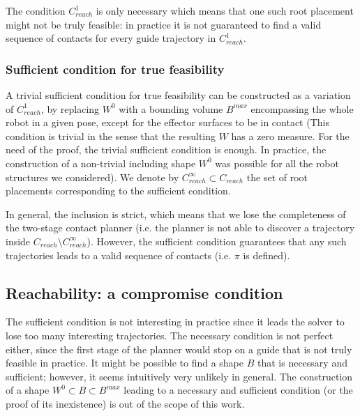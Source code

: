 The condition $C_{reach}^1$ is only necessary which means that one such root placement might not be truly feasible: in practice it is not guaranteed to find a valid sequence of contacts for every guide trajectory in $C_{reach}^1$.

\subsubsection*{Sufficient condition for true feasibility}
A trivial sufficient condition for true feasibility can be constructed as a variation of $C_{reach}^1$, by replacing $W^0$ with a bounding volume $B^{max}$ encompassing the whole robot in a given pose, except for the effector surfaces to be in contact (This condition is trivial in the sense that the resulting $W$ has a zero measure. For the need of the proof, the trivial sufficient condition is enough. In practice, the construction of a non-trivial including shape $W^0$ was possible for all the robot structures we considered). We denote by $C_{reach}^\infty \subset C_{reach}$ the set of root placements corresponding to the sufficient condition.

In general, the inclusion is strict, which means that we lose the completeness of the two-stage contact planner (i.e. the planner is not able to discover a trajectory inside $C_{reach} \setminus C_{reach}^\infty$). However, the sufficient condition guarantees that any such trajectories leads to a valid sequence of contacts (i.e. $\pi$ is defined).

\subsection{Reachability: a compromise condition}
The sufficient condition is not  interesting in practice since it leads the solver to lose too many interesting trajectories. The necessary condition is not perfect either, since the first stage of the planner would stop on a guide that is not truly feasible in practice. It might be possible to find a shape $B$ that is necessary and sufficient; however, it seems intuitively very unlikely in general. The construction of a shape $W^0 \subset B \subset B^{max}$ leading to a necessary and sufficient condition (or the proof of its inexistence) is out of the scope of this work.

